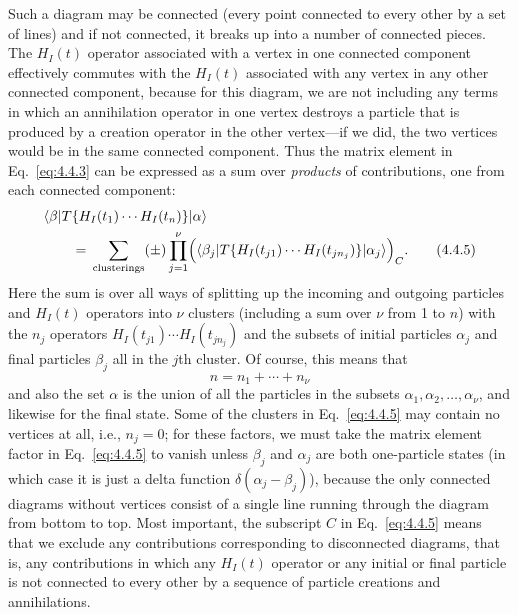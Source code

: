 Such a diagram may be connected (every point connected to every other by a set
of lines) and if not connected, it breaks up into a number of connected pieces.
The $H_I(t)$ operator associated with a vertex in one connected component
effectively commutes with the $H_I(t)$ associated with any vertex in any other
connected component, because for this diagram, we are not including any terms
in which an annihilation operator in one vertex destroys a particle that is
produced by a creation operator in the other vertex---if we did, the two
vertices would be in the same connected component. Thus the matrix element in
Eq.~\eqref{eq:4.4.3} can be expressed as a sum over \emph{products} of contributions,
one from each connected component:
\begin{align}
&\langle \beta\rvert T\{H_I(t_1)\cdots H_I(t_n)\}\lvert \alpha\rangle
\notag\\
&\qquad={}
\sum_{\text{clusterings}}(\pm)\prod_{j=1}^{\nu}
 \Bigl(\langle \beta_j\rvert T\{H_I(t_{j1})\cdots H_I(t_{jn_j})\}
 \lvert \alpha_j\rangle\Bigr)_C.
\tag{4.4.5}
\label{eq:4.4.5}
\end{align}
Here the sum is over all ways of splitting up the incoming and outgoing
particles and $H_I(t)$ operators into $\nu$ clusters (including a sum over
$\nu$ from 1 to $n$) with the $n_j$ operators
$H_I(t_{j1})\cdots H_I(t_{jn_j})$ and the subsets of initial particles
$\alpha_j$ and final particles $\beta_j$ all in the $j$th cluster. Of course,
this means that
\[
n=n_1+\cdots+n_\nu
\]
and also the set $\alpha$ is the union of all the particles in the subsets
$\alpha_1,\alpha_2,\ldots,\alpha_\nu$, and likewise for the final state. Some
of the clusters in Eq.~\eqref{eq:4.4.5} may contain no vertices at all, i.e., $n_j=0$;
for these factors, we must take the matrix element factor in Eq.~\eqref{eq:4.4.5} to
vanish unless $\beta_j$ and $\alpha_j$ are both one-particle states (in which
case it is just a delta function $\delta(\alpha_j-\beta_j)$), because the only
connected diagrams without vertices consist of a single line running through
the diagram from bottom to top. Most important, the subscript $C$ in
Eq.~\eqref{eq:4.4.5} means that we exclude any contributions corresponding to disconnected
diagrams, that is, any contributions in which any $H_I(t)$ operator or any
initial or final particle is not connected to every other by a sequence of
particle creations and annihilations.

